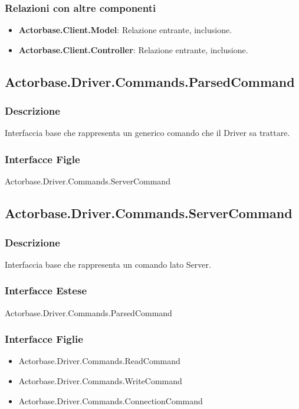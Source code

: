 \documentclass[a4paper]{article}
\begin{document}
		\subsubsection{Relazioni con altre componenti}
			\begin{itemize}
				\item \textbf{Actorbase.Client.Model}: Relazione entrante, inclusione.
				\item \textbf{Actorbase.Client.Controller}:	Relazione entrante, inclusione.
			\end{itemize}

		

		\subsection{Actorbase.Driver.Commands.ParsedCommand}
			\subsubsection{Descrizione} Interfaccia base che rappresenta un generico comando che il Driver sa trattare.
			\subsubsection{Interfacce Figle} Actorbase.Driver.Commands.ServerCommand

		
		\subsection{Actorbase.Driver.Commands.ServerCommand}
			\subsubsection{Descrizione} Interfaccia base che rappresenta un comando lato Server.
			\subsubsection{Interfacce Estese} Actorbase.Driver.Commands.ParsedCommand
			\subsubsection{Interfacce Figlie}
				\begin{itemize}
					\item Actorbase.Driver.Commands.ReadCommand
					\item Actorbase.Driver.Commands.WriteCommand
					\item Actorbase.Driver.Commands.ConnectionCommand
				\end{itemize}
		
\end{document}
